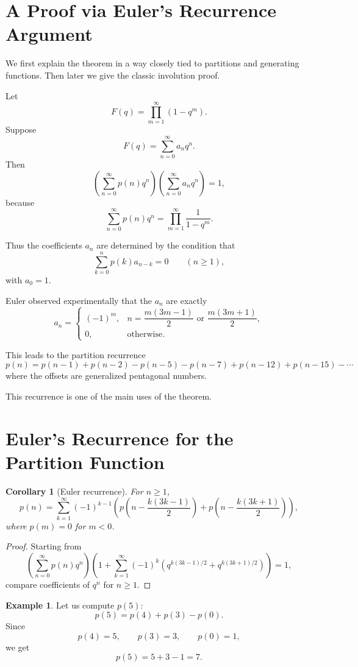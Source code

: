 \documentclass[11pt]{article}
\newtheorem{corollary}[theorem]{Corollary}
\theoremstyle{definition}
\newtheorem{example}[theorem]{Example}
\theoremstyle{remark}
\begin{document}
	\section{A Proof via Euler's Recurrence Argument}
	
	We first explain the theorem in a way closely tied to partitions and generating functions. Then later we give the classic involution proof.
	
	Let
	\[
	F(q)=\prod_{m=1}^{\infty}(1-q^m).
	\]
	Suppose
	\[
	F(q)=\sum_{n=0}^{\infty} a_n q^n.
	\]
	Then
	\[
	\left(\sum_{n=0}^{\infty} p(n)q^n\right)\left(\sum_{n=0}^{\infty} a_n q^n\right)=1,
	\]
	because
	\[
	\sum_{n=0}^{\infty} p(n)q^n=\prod_{m=1}^{\infty}\frac{1}{1-q^m}.
	\]
	
	Thus the coefficients \(a_n\) are determined by the condition that
	\[
	\sum_{k=0}^{n} p(k)a_{n-k}=0
	\qquad (n\ge 1),
	\]
	with \(a_0=1\).
	
	Euler observed experimentally that the \(a_n\) are exactly
	\[
	a_n=
	\begin{cases}
		(-1)^m, & n=\dfrac{m(3m-1)}{2}\text{ or }\dfrac{m(3m+1)}{2},\\[1em]
		0, & \text{otherwise}.
	\end{cases}
	\]
	
	This leads to the partition recurrence
	\[
	p(n)=p(n-1)+p(n-2)-p(n-5)-p(n-7)+p(n-12)+p(n-15)-\cdots
	\]
	where the offsets are generalized pentagonal numbers.
	
	This recurrence is one of the main uses of the theorem.
	
	\section{Euler's Recurrence for the Partition Function}
	
	\begin{corollary}[Euler recurrence]
		For \(n\ge 1\),
		\[
		p(n)
		=
		\sum_{k=1}^{\infty}(-1)^{k-1}
		\left(
		p\!\left(n-\frac{k(3k-1)}{2}\right)
		+
		p\!\left(n-\frac{k(3k+1)}{2}\right)
		\right),
		\]
		where \(p(m)=0\) for \(m<0\).
	\end{corollary}
	
	\begin{proof}
		Starting from
		\[
		\left(\sum_{n=0}^{\infty}p(n)q^n\right)
		\left(1+\sum_{k=1}^{\infty}(-1)^k
		\left(q^{k(3k-1)/2}+q^{k(3k+1)/2}\right)\right)=1,
		\]
		compare coefficients of \(q^n\) for \(n\ge 1\).
	\end{proof}
	
	\begin{example}
		Let us compute \(p(5)\):
		\[
		p(5)=p(4)+p(3)-p(0).
		\]
		Since
		\[
		p(4)=5,\qquad p(3)=3,\qquad p(0)=1,
		\]
		we get
		\[
		p(5)=5+3-1=7.
		\]
	\end{example}
	
\end{document}
